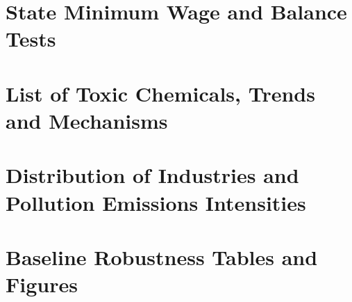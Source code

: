 \documentclass[12pt, english]{article}
\begin{document}
    \newpage
    \begin{appendices}
        \renewcommand\thesection{\Roman{section}} %
        \renewcommand\thesubsection{\Alph{subsection}} %


        \section{State Minimum Wage and Balance Tests}\label{sec:appendix-state-minimum-wage-and-balance-tests}
        
        
        
        
        


        \section{List of Toxic Chemicals, Trends and Mechanisms}\label{sec:appendix-list-of-toxic-chemicals-trends-and-mechanisms}
        
        
        
        
        
        
        


        \section{Distribution of Industries and Pollution Emissions Intensities}\label{sec:appendix-distribution-of-industries-and-pollution-emissions-intensities}
        
        
        
        
        
        
        
        
        
        
        
        
        


        \section{Baseline Robustness Tables and Figures}\label{sec:appendix-baseline-robustness-tables-and-figures}
        
        
        

    \end{appendices}
    \newpage
    \printbibliography
\end{document}
